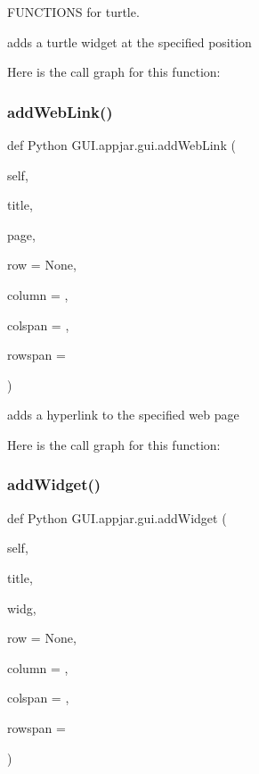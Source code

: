 F\+U\+N\+C\+T\+I\+O\+NS for turtle. 

\begin{DoxyVerb}adds a turtle widget at the specified position \end{DoxyVerb}
 Here is the call graph for this function\+:
\mbox{\label{class_python_01_g_u_i_1_1appjar_1_1gui_aff406851f99c330dd2adadc32a9e50e8}} 
\subsubsection{\texorpdfstring{add\+Web\+Link()}{addWebLink()}}
{\footnotesize\ttfamily def Python G\+U\+I.\+appjar.\+gui.\+add\+Web\+Link (\begin{DoxyParamCaption}\item[{}]{self,  }\item[{}]{title,  }\item[{}]{page,  }\item[{}]{row = {\ttfamily None},  }\item[{}]{column = {},  }\item[{}]{colspan = {},  }\item[{}]{rowspan = {} }\end{DoxyParamCaption})}

\begin{DoxyVerb}adds a hyperlink to the specified web page \end{DoxyVerb}
 Here is the call graph for this function\+:
\mbox{\label{class_python_01_g_u_i_1_1appjar_1_1gui_a8526c3be9ed18a28197c32f53ec9cb0e}} 
\subsubsection{\texorpdfstring{add\+Widget()}{addWidget()}}
{\footnotesize\ttfamily def Python G\+U\+I.\+appjar.\+gui.\+add\+Widget (\begin{DoxyParamCaption}\item[{}]{self,  }\item[{}]{title,  }\item[{}]{widg,  }\item[{}]{row = {\ttfamily None},  }\item[{}]{column = {},  }\item[{}]{colspan = {},  }\item[{}]{rowspan = {} }\end{DoxyParamCaption})}

